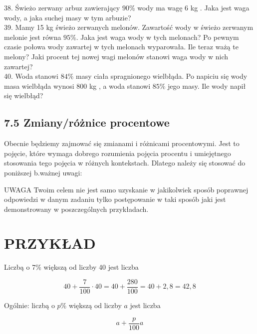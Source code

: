 \documentclass[10pt]{article}
\begin{document}
38. Świeżo zerwany arbuz zawierający \(90 \%\) wody ma wagę 6 kg . Jaka jest waga wody, a jaka suchej masy w tym arbuzie?\\
39. Mamy 15 kg świeżo zerwanych melonów. Zawartość wody w świeżo zerwanym melonie jest równa \(95 \%\). Jaka jest waga wody w tych melonach? Po pewnym czasie połowa wody zawartej w tych melonach wyparowała. Ile teraz ważą te melony? Jaki procent tej nowej wagi melonów stanowi waga wody w nich zawartej?\\
40. Woda stanowi \(84 \%\) masy ciała spragnionego wielbłąda. Po napiciu się wody masa wielbłąda wynosi 800 kg , a woda stanowi \(85 \%\) jego masy. Ile wody napił się wielbłąd?

\subsection*{7.5 Zmiany/różnice procentowe}
Obecnie będziemy zajmować się zmianami i różnicami procentowymi. Jest to pojęcie, które wymaga dobrego rozumienia pojęcia procentu i umiejętnego stosowania tego pojęcia w różnych kontekstach. Dlatego należy się stosować do poniższej b.ważnej uwagi:

UWAGA Twoim celem nie jest samo uzyskanie w jakikolwiek sposób poprawnej odpowiedzi w danym zadaniu tylko postępowanie w taki sposób jaki jest demonstrowany w poszczególnych przykładach.

\section*{PRZYKŁAD}
Liczbą o 7\% większą od liczby 40 jest liczba

\[
40+\frac{7}{100} \cdot 40=40+\frac{280}{100}=40+2,8=42,8
\]

Ogólnie: liczbą o \(p \%\) większą od liczby \(a\) jest liczba

\[
a+\frac{p}{100} a
\]
\end{document}
